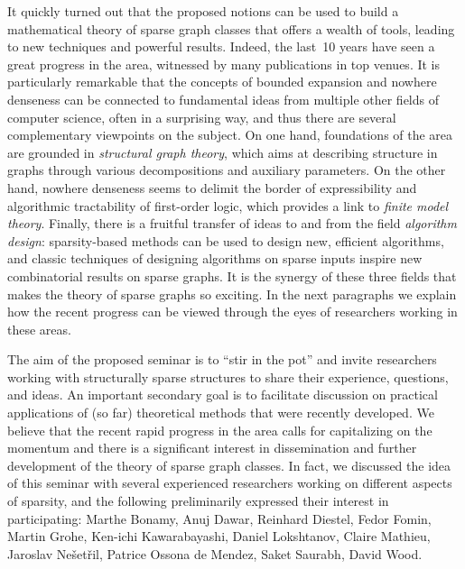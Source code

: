 It quickly turned out that the proposed notions can be used to build a mathematical theory of sparse graph classes that offers a wealth of tools, leading to new techniques and powerful results.
Indeed, the last~10 years have seen a great progress in the area, witnessed by many publications in top venues.
It is particularly remarkable that the concepts of bounded expansion and nowhere denseness can be connected
to fundamental ideas from multiple other fields of computer science, often in a surprising way, and thus there are several complementary viewpoints on the subject.
On one hand, foundations of the area are grounded in {\em{structural graph theory}}, which aims at describing structure in graphs through various decompositions and auxiliary parameters.
On the other hand, nowhere denseness seems to delimit the border of expressibility and algorithmic tractability of first-order logic, which provides a link to {\em{finite model theory}}.
Finally, there is a fruitful transfer of ideas to and from the field {\em{algorithm design}}: sparsity-based methods can be used to design new, efficient algorithms,
and classic techniques of designing algorithms on sparse inputs inspire new combinatorial results on sparse graphs.
It is the synergy of these three fields that makes the theory of sparse graphs so exciting.
In the next paragraphs we explain how the recent progress can be viewed through the eyes of researchers working in these areas.

The aim of the proposed seminar is to ``stir in the pot'' and invite researchers working with structurally sparse structures to share their experience, questions, and ideas.
An important secondary goal is to facilitate discussion on practical applications of (so far) theoretical methods that were recently developed.
We believe that the recent rapid progress in the area calls for capitalizing on the momentum and there is a significant interest in dissemination and further development of the theory of sparse graph classes.
In fact, we discussed the idea of this seminar with several experienced researchers working on different aspects of sparsity, and the following preliminarily expressed their interest in participating:
Marthe Bonamy, Anuj Dawar, Reinhard Diestel, Fedor Fomin, Martin Grohe, Ken-ichi Kawarabayashi, Daniel Lokshtanov, Claire Mathieu, Jaroslav Ne\v{s}et\v{r}il, Patrice Ossona de Mendez, Saket Saurabh, David Wood.

